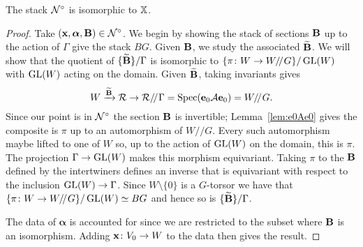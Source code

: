 \documentclass{amsart}
\newcommand{\balpha}{\boldsymbol{\alpha}}
\theoremstyle{definition}
\begin{document}
\begin{theorem}\label{thm:tannaka}
The stack ${\mathcal{N}}^\circ$ is isomorphic to $\mathbb{X}$.
\end{theorem}

\begin{proof}
Take $(\bfx, \balpha, \bfB) \in \cN^\circ$.
We begin by showing the stack of sections $\mathbf{B}$ up to the action of $\Gamma$ give the stack $BG$.
Given $\mathbf{B}$, we study the associated $\widetilde{\mathbf{B}}$.
We will show that the quotient of $\{\widetilde{\mathbf{B}}\} /\Gamma$ is isomorphic to $\{\pi \colon W \rightarrow W/ \! /_{} G\}/\operatorname{GL}(W)$ with $\operatorname{GL}(W)$ acting on the domain.
Given $\widetilde{\mathbf{B}}$, taking invariants gives 
$$W \xrightarrow{\widetilde{\mathbf{B}}} \mathcal{R} \rightarrow \mathcal{R} / \! /_{} \Gamma = \operatorname{Spec}(\mathbf{e}_0 \mathcal{A} \mathbf{e}_0) = W/ \! /_{} G.$$
Since our point is in $\mathcal{N}^\circ$ the section $\mathbf{B}$ is invertible; Lemma~\ref{lem:e0Ae0} gives the composite is $\pi$ up to an automorphism of $W//G$.
Every such automorphism maybe lifted to one of $W$ so, up to the action of $\operatorname{GL}(W)$ on the domain, this is $\pi$.
The projection $\Gamma \rightarrow \operatorname{GL}(W)$ makes this morphism equivariant.
Taking $\pi$ to the $\mathbf{B}$ defined by the intertwiners defines an inverse that is equivariant with respect to the inclusion $\operatorname{GL}(W) \rightarrow \Gamma$.
Since $W\setminus \{0\}$ is a $G$-torsor we have that $\{\pi \colon W \rightarrow W/ \! /_{} G\}/\operatorname{GL}(W) \simeq BG$ and hence so is $\{\widetilde{\mathbf{B}}\} /\Gamma$.

The data of $\balpha$ is accounted for since we are restricted to the subset where $\mathbf{B}$ is an isomorphism.
Adding $\mathbf{x} \colon V_0 \rightarrow W$ to the data then gives the result.
\end{proof}
\end{document}
